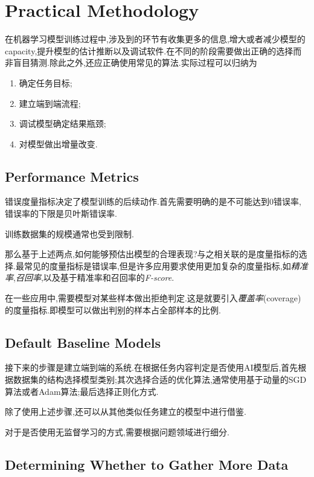 \chapter{Practical Methodology}

在机器学习模型训练过程中,涉及到的环节有收集更多的信息,增大或者减少模型的capacity,提升模型的估计推断以及调试软件.在不同的阶段需要做出正确的选择而非盲目猜测.除此之外,还应正确使用常见的算法.实际过程可以归纳为
\begin{enumerate}
    \item 确定任务目标;
    \item 建立端到端流程;
    \item 调试模型确定结果瓶颈;
    \item 对模型做出增量改变.
\end{enumerate}

\section{Performance Metrics}

错误度量指标决定了模型训练的后续动作.首先需要明确的是不可能达到$0$错误率,错误率的下限是贝叶斯错误率.

训练数据集的规模通常也受到限制.

那么基于上述两点,如何能够预估出模型的合理表现?与之相关联的是度量指标的选择.最常见的度量指标是错误率,但是许多应用要求使用更加复杂的度量指标,如\textit{精准率},\textit{召回率},以及基于精准率和召回率的\textit{F-score}.

在一些应用中,需要模型对某些样本做出拒绝判定.这是就要引入\textit{覆盖率}(coverage)的度量指标.即模型可以做出判别的样本占全部样本的比例.

\section{Default Baseline Models}

接下来的步骤是建立端到端的系统.在根据任务内容判定是否使用AI模型后,首先根据数据集的结构选择模型类别;其次选择合适的优化算法,通常使用基于动量的SGD算法或者Adam算法;最后选择正则化方式.

除了使用上述步骤,还可以从其他类似任务建立的模型中进行借鉴.

对于是否使用无监督学习的方式,需要根据问题领域进行细分.

\section{Determining Whether to Gather More Data}

